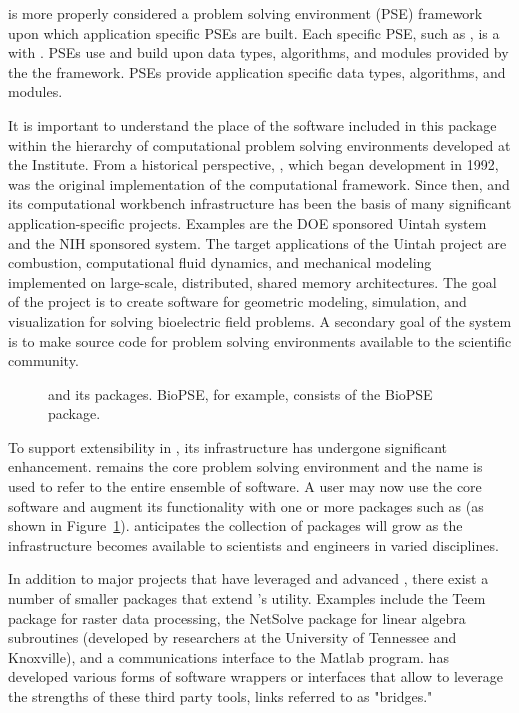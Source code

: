 \sr{} is more properly considered a problem solving environment (PSE)
framework upon which application specific PSEs are built.  Each
specific PSE, such as \BIOPSE{}, is a  with \sr{}.  PSEs
use and build upon data types, algorithms, and modules provided by the
the \sr{} framework.  PSEs provide application specific data types,
algorithms, and modules.

It is important to understand the place of the software included in
this package within the hierarchy of computational problem solving
environments developed at the \sci{} Institute.  From a historical
perspective, \SR{}, which began development in 1992, was the
original implementation of the computational
framework\cite{CRJ:Joh94c,RSM:Par95,RSM:Par95b,RSM:Par97,RSM:Par97b,CRJ:Parker99b}.
Since then, \SR{} and its computational workbench infrastructure has
been the basis of many significant application-specific projects. 
Examples are the DOE sponsored Uintah system \cite{RSM:Dav2000}
and the NIH sponsored \BIOPSE{} system.  The target applications of
the Uintah project are combustion, computational fluid dynamics, and
mechanical modeling implemented on large-scale, distributed, shared
memory architectures.  The goal of the \BIOPSE{} project is to create
software for geometric modeling, simulation, and visualization for
solving bioelectric field problems.  A secondary goal of
the \SR{} system is to make source code for  problem solving
environments available to the scientific community.

\begin{figure}[htb]
  \centering
  \begin{makeimage} \end{makeimage}
  \eabfig
  \caption{\label{fig:eab-BioPSE} \sr{} and its
    packages.  BioPSE, for example, consists of \sr{}
    the BioPSE package.}
\end{figure}

To support extensibility in \sr{}, its infrastructure has undergone
significant enhancement. \SR{} remains the core problem solving
environment and the name is used to refer to the entire ensemble of
software.  A user may now use the core \SR{} software and augment its
functionality with one or more packages such as \BIOPSE{} (as shown in
Figure~\ref{fig:eab-BioPSE}).  \sci{} anticipates the collection of
packages will grow as the \SR{} infrastructure becomes available to
scientists and engineers in varied disciplines.

In addition to major projects that have leveraged and
advanced \SR{}, there exist a number of smaller packages that extend
\SR{}'s utility.  Examples include the Teem package for raster data
processing, the NetSolve package for linear algebra subroutines
(developed by researchers at the University of Tennessee and
Knoxville), and a communications interface to the Matlab program.  \SCI{}
has developed various forms of software wrappers or interfaces that
allow \SR{} to leverage the strengths of these third party tools,
links referred to as "bridges."

